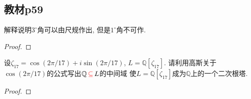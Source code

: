 \subsection{教材p59}

\begin{problem}
    解释说明$3^\circ$角可以由尺规作出, 但是$1^\circ$角不可作.
\end{problem}

\begin{proof}
    
\end{proof}

\begin{problem}
    设$\zeta_{17} = \cos(2\pi/17) + i\sin(2\pi/17)$,
$L = \mathbb{Q}[\zeta_{17}]$. 请利用高斯关于
$\cos(2\pi/17)$的公式写出$\mathbb{Q} \,\textcolor{red}{\subseteq}\, L$的中间域
使$L = \mathbb{Q}[\zeta_{17}]$成为$\mathbb{Q}$上的一个二次根塔.
\end{problem}

\begin{proof}
    
\end{proof}